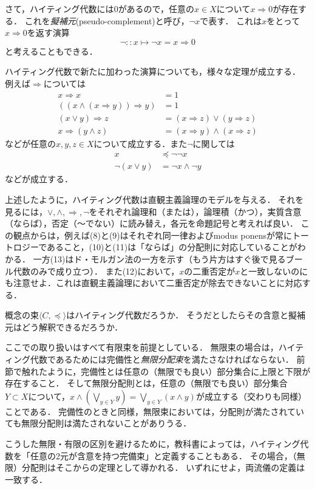 \documentclass[11pt,a4paper]{jsarticle}
\begin{document}
さて，ハイティング代数には$0$があるので，任意の$x \in X$について$x \Rightarrow 0$が存在する．
これを\emph{擬補元}(pseudo-complement)と呼び，$\neg x$で表す．
これは$x$をとって$x \Rightarrow 0$を返す演算
\[
 \neg:: x \mapsto \neg x = x \Rightarrow 0
\]
と考えることもできる．

ハイティング代数で新たに加わった演算についても，様々な定理が成立する．
例えば$\Rightarrow$については
\begin{align}
 x \Rightarrow x &= 1 \\
((x \wedge (x \Rightarrow y)) \Rightarrow y) &= 1 \label{eqn:md}\\
(x \vee y ) \Rightarrow z &= (x \Rightarrow z) \vee (y \Rightarrow z) \\
x \Rightarrow (y \wedge z ) &= (x \Rightarrow y) \wedge (x \Rightarrow z) 
\end{align}
などが任意の$x, y, z \in X$について成立する．また$\neg$に関しては
\begin{align}
 x & \preceq \neg \neg x \\
 \neg (x \vee y) &= \neg x \wedge \neg y
\end{align}
などが成立する．

\begin{example}
上述したように，ハイティング代数は直観主義論理のモデルを与える．
それを見るには，$\vee, \wedge, \Rightarrow, \neg$をそれぞれ論理和（または），論理積（かつ），実質含意（ならば），否定（〜でない）に読み替え，各元を命題記号と考えれば良い．
この観点からは，例えば(8)と(9)はそれぞれ同一律およびmodus ponensが常にトートロジーであること，(10)と(11)は「ならば」の分配則に対応していることがわかる．
一方(13)はド・モルガン法の一方を示す（もう片方はすぐ後で見るブール代数のみで成り立つ）．
また(12)において，$x$の二重否定が$x$と一致しないのにも注意せよ．これは直観主義論理において二重否定が除去できないことに対応する．
\end{example}


\begin{example}
概念の束$\langle C, \preceq \rangle$はハイティング代数だろうか．
そうだとしたらその含意と擬補元はどう解釈できるだろうか．
\end{example}


\begin{develop}
ここでの取り扱いはすべて有限束を前提としている．
無限束の場合は，ハイティング代数であるためには完備性と\emph{無限分配束}を満たさなければならない．
前節で触れたように，完備性とは任意の（無限でも良い）部分集合に上限と下限が存在すること．
そして無限分配則とは，任意の（無限でも良い）部分集合$Y \subset X$について，$x \wedge (\bigvee_{y \in Y} y) = \bigvee_{y \in Y}(x \wedge y)$が成立する（交わりも同様）ことである．
完備性のときと同様，無限束においては，分配則が満たされていても無限分配則は満たされないことがありうる．

こうした無限・有限の区別を避けるために，教科書によっては，ハイティング代数を「任意の2元が含意を持つ完備束」と定義することもある．
その場合，（無限）分配則はそこからの定理として導かれる．
いずれにせよ，両流儀の定義は一致する．
\end{develop}
\end{document}
